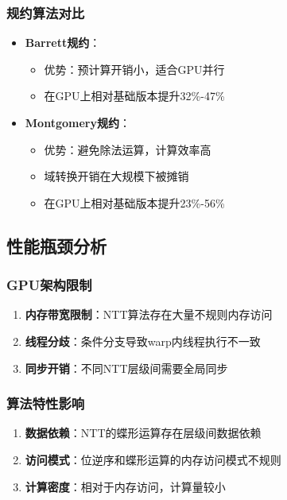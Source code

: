 \documentclass[a4paper]{article}
\begin{document}
	\subsubsection{规约算法对比}
	\begin{itemize}
		\item \textbf{Barrett规约}：
		\begin{itemize}
			\item 优势：预计算开销小，适合GPU并行
			\item 在GPU上相对基础版本提升32\%-47\%
		\end{itemize}
		\item \textbf{Montgomery规约}：
		\begin{itemize}
			\item 优势：避免除法运算，计算效率高
			\item 域转换开销在大规模下被摊销
			\item 在GPU上相对基础版本提升23\%-56\%
		\end{itemize}
	\end{itemize}
	
	\subsection{性能瓶颈分析}
	
	\subsubsection{GPU架构限制}
	\begin{enumerate}
		\item \textbf{内存带宽限制}：NTT算法存在大量不规则内存访问
		\item \textbf{线程分歧}：条件分支导致warp内线程执行不一致
		\item \textbf{同步开销}：不同NTT层级间需要全局同步
	\end{enumerate}
	
	\subsubsection{算法特性影响}
	\begin{enumerate}
		\item \textbf{数据依赖}：NTT的蝶形运算存在层级间数据依赖
		\item \textbf{访问模式}：位逆序和蝶形运算的内存访问模式不规则
		\item \textbf{计算密度}：相对于内存访问，计算量较小
	\end{enumerate}
	
\end{document}
